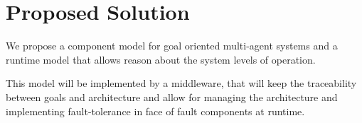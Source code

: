 \section{Proposed Solution}

We propose a component model for goal oriented multi-agent systems  and a runtime model that allows reason about the system levels of operation.

This model will be implemented by a middleware, that will keep the traceability between goals and architecture and allow for managing the architecture and implementing fault-tolerance in face of fault components at runtime.
